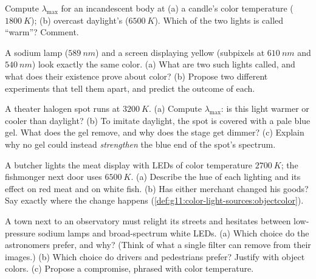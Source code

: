 \begin{exercise}[$\star\star$]\label{exo:g11:color-light-sources:11}
Compute $\lambda_{\max}$ for an incandescent body at (a) a candle's
color temperature ($\qty{1800}{K}$); (b) overcast daylight's
($\qty{6500}{K}$). Which of the two lights is called ``warm''? Comment.
\end{exercise}

\begin{exercise}[$\star\star\star$]\label{exo:g11:color-light-sources:12}
A sodium lamp ($\qty{589}{nm}$) and a screen displaying yellow
(subpixels at $\qty{610}{nm}$ and $\qty{540}{nm}$) look exactly the same
color. (a) What are two such lights called, and what does their
existence prove about color? (b) Propose two different experiments that
tell them apart, and predict the outcome of each.
\end{exercise}

\begin{exercise}[$\star\star\star$]\label{exo:g11:color-light-sources:13}
A theater halogen spot runs at $\qty{3200}{K}$. (a) Compute
$\lambda_{\max}$: is this light warmer or cooler than daylight? (b) To
imitate daylight, the spot is covered with a pale blue gel. What does
the gel remove, and why does the stage get dimmer? (c) Explain why no
gel could instead \emph{strengthen} the blue end of the spot's spectrum.
\end{exercise}

\begin{exercise}[$\star\star\star$]\label{exo:g11:color-light-sources:14}
A butcher lights the meat display with LEDs of color temperature
$\qty{2700}{K}$; the fishmonger next door uses $\qty{6500}{K}$.
(a) Describe the hue of each lighting and its effect on red meat and on
white fish. (b) Has either merchant changed his goods? Say exactly
where the change happens (\cref{def:g11:color-light-sources:objectcolor}).
\end{exercise}

\begin{exercise}[$\star\star\star$]\label{exo:g11:color-light-sources:15}
A town next to an observatory must relight its streets and hesitates
between low-pressure sodium lamps and broad-spectrum white LEDs.
(a) Which choice do the astronomers prefer, and why? (Think of what a
single filter can remove from their images.) (b) Which choice do
drivers and pedestrians prefer? Justify with object colors.
(c) Propose a compromise, phrased with color temperature.
\end{exercise}

